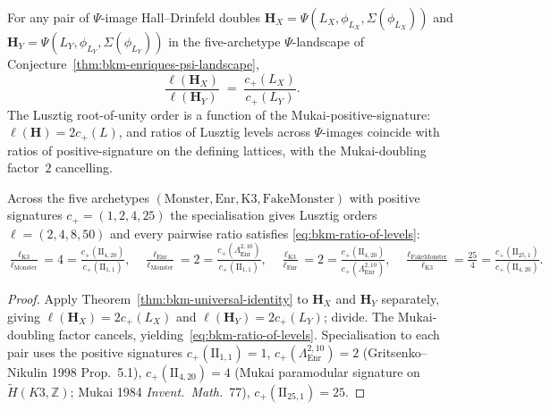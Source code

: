 \begin{theorem}
\label{thm:bkm-ratio-of-levels}
For any pair of $\Psi$-image Hall--Drinfeld doubles
$\mathbf H_X = \Psi(L_X,\phi_{L_X},\Sigma(\phi_{L_X}))$ and
$\mathbf H_Y = \Psi(L_Y,\phi_{L_Y},\Sigma(\phi_{L_Y}))$ in the
five-archetype $\Psi$-landscape of
Conjecture~\ref{thm:bkm-enriques-psi-landscape},
\begin{equation}
\label{eq:bkm-ratio-of-levels}
 \boxed{\;\frac{\ell(\mathbf H_X)}{\ell(\mathbf H_Y)}
 \;=\;
 \frac{c_+(L_X)}{c_+(L_Y)}.\;}
\end{equation}
The Lusztig root-of-unity order is a function of the
Mukai-positive-signature: $\ell(\mathbf H) = 2c_+(L)$, and ratios of
Lusztig levels across $\Psi$-images coincide with ratios of
positive-signature on the defining lattices, with the Mukai-doubling
factor~$2$ cancelling.

Across the five archetypes $(\mathrm{Monster},\mathrm{Enr},\mathrm{K3},
\mathrm{FakeMonster})$ with positive signatures
$c_+ = (1, 2, 4, 25)$ the specialisation gives Lusztig orders
$\ell = (2, 4, 8, 50)$ and every pairwise ratio satisfies
\eqref{eq:bkm-ratio-of-levels}:
\[
 \tfrac{\ell_{\mathrm{K3}}}{\ell_{\mathrm{Monster}}} = 4 =
 \tfrac{c_+(\mathrm{II}_{4,20})}{c_+(\mathrm{II}_{1,1})},\quad
 \tfrac{\ell_{\mathrm{Enr}}}{\ell_{\mathrm{Monster}}} = 2 =
 \tfrac{c_+(\Lambda^{2,10}_{\mathrm{Enr}})}{c_+(\mathrm{II}_{1,1})},\quad
 \tfrac{\ell_{\mathrm{K3}}}{\ell_{\mathrm{Enr}}} = 2 =
 \tfrac{c_+(\mathrm{II}_{4,20})}{c_+(\Lambda^{2,10}_{\mathrm{Enr}})},\quad
 \tfrac{\ell_{\mathrm{FakeMonster}}}{\ell_{\mathrm{K3}}} = \tfrac{25}{4} =
 \tfrac{c_+(\mathrm{II}_{25,1})}{c_+(\mathrm{II}_{4,20})}.
\]
\end{theorem}

\begin{proof}
Apply Theorem~\ref{thm:bkm-universal-identity} to $\mathbf H_X$ and
$\mathbf H_Y$ separately, giving $\ell(\mathbf H_X) = 2c_+(L_X)$ and
$\ell(\mathbf H_Y) = 2c_+(L_Y)$; divide. The Mukai-doubling factor
cancels, yielding~\eqref{eq:bkm-ratio-of-levels}. Specialisation to
each pair uses the positive signatures
$c_+(\mathrm{II}_{1,1}) = 1$,
$c_+(\Lambda^{2,10}_{\mathrm{Enr}}) = 2$
(Gritsenko--Nikulin 1998 Prop.~5.1),
$c_+(\mathrm{II}_{4,20}) = 4$ (Mukai paramodular signature on
$\widetilde H(K3,\mathbb Z)$; Mukai 1984 \emph{Invent.~Math.}~77),
$c_+(\mathrm{II}_{25,1}) = 25$.
\end{proof}

